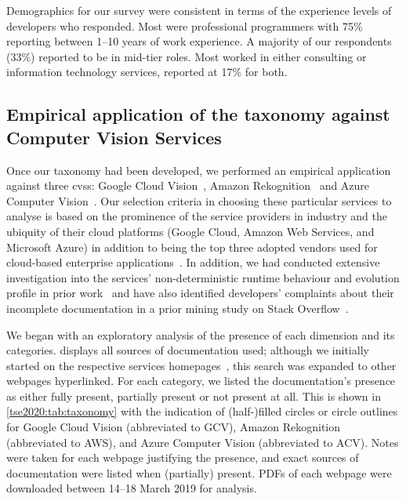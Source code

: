 Demographics for our survey were consistent in terms of the experience levels of developers who responded. Most were professional programmers with 75\% reporting between 1--10 years of work experience. A majority of our respondents (33\%) reported to be in mid-tier roles. Most worked in either consulting or information technology services, reported at 17\% for both.

\subsection{Empirical application of the taxonomy against Computer Vision Services}

Once our taxonomy had been developed, we performed an empirical application against three \glspl{cvs}: Google Cloud Vision~, Amazon Rekognition~ and Azure Computer Vision~. Our selection criteria in choosing these particular services to analyse is based on the prominence of the service providers in industry and the ubiquity of their cloud platforms (Google Cloud, Amazon Web Services, and Microsoft Azure) in addition to being the top three adopted vendors used for cloud-based enterprise applications~\citep{RightScaleInc:2018kJ}. In addition, we had conducted extensive investigation into the services' non-deterministic runtime behaviour and evolution profile in prior work~\citep{Cummaudo:2019icsme} and have also identified developers' complaints about their incomplete documentation in a prior mining study on Stack Overflow~\citep{Cummaudo:2020icse}.

We began with an exploratory analysis of the presence of each dimension and its categories.  displays all sources of documentation used; although we initially started on the respective services homepages~, this search was expanded to other webpages hyperlinked. For each category, we listed the documentation's presence as either fully present, partially present or not present at all. This is shown in \cref{tse2020:tab:taxonomy} with the indication of (half-)filled circles or circle outlines for Google Cloud Vision (abbreviated to GCV), Amazon Rekognition (abbreviated to AWS), and Azure Computer Vision (abbreviated to ACV). Notes were taken for each webpage justifying the presence, and exact sources of documentation were listed when (partially) present. PDFs of each webpage were downloaded between 14--18 March 2019 for analysis.

